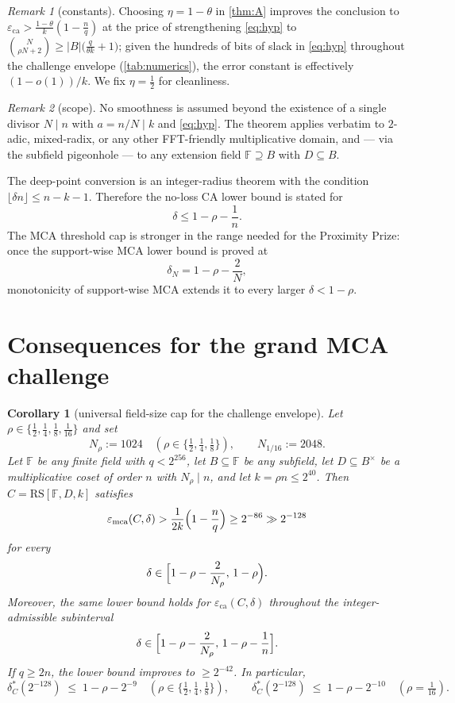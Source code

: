 \documentclass[11pt]{article}
\newtheorem{corollary}[corollary]{Corollary}
\theoremstyle{definition}
\theoremstyle{remark}
\newtheorem{remark}[remark]{Remark}
\newcommand{\F}{\mathbb{F}}
\newcommand{\B}{B}
\newcommand{\RS}{\mathrm{RS}}
\newcommand{\eca}{\varepsilon_{\mathrm{ca}}}
\newcommand{\emca}{\varepsilon_{\mathrm{mca}}}
\begin{document}
\begin{remark}[constants]\label{rem:eta}
Choosing $\eta=1-\theta$ in \cref{thm:A} improves the conclusion to $\eca>\frac{1-\theta}k(1-\frac nq)$ at the price of strengthening \eqref{eq:hyp} to $\binom N{\rho N+2}\ge|\B|\bigl(\frac q{\theta k}+1\bigr)$; given the hundreds of bits of slack in \eqref{eq:hyp} throughout the challenge envelope (\cref{tab:numerics}), the error constant is effectively $(1-o(1))/k$. We fix $\eta=\frac12$ for cleanliness.
\end{remark}

\begin{remark}[scope]\label{rem:scope}
No smoothness is assumed beyond the existence of a single divisor $N\mid n$ with $a=n/N\mid k$ and \eqref{eq:hyp}. The theorem applies verbatim to $2$-adic, mixed-radix, or any other FFT-friendly multiplicative domain, and --- via the subfield pigeonhole --- to any extension field $\F\supseteq\B$ with $D\subseteq\B$.

The deep-point conversion is an integer-radius theorem with the condition $\lfloor\delta n\rfloor\le n-k-1$. Therefore the no-loss CA lower bound is stated for
\[
        \delta \le 1-\rho-\frac1n .
\]
The MCA threshold cap is stronger in the range needed for the Proximity Prize: once the support-wise MCA lower bound is proved at
\[
        \delta_N=1-\rho-\frac2N,
\]
monotonicity of support-wise MCA extends it to every larger $\delta<1-\rho$.
\end{remark}

\section{Consequences for the grand MCA challenge}\label{sec:grand}

\begin{corollary}[universal field-size cap for the challenge envelope]\label{cor:grand}
Let $\rho\in\{\frac12,\frac14,\frac18,\frac1{16}\}$ and set
\[
N_\rho:=1024\quad(\rho\in\{\tfrac12,\tfrac14,\tfrac18\}),\qquad N_{1/16}:=2048 .
\]
Let $\F$ be any finite field with $q<2^{256}$, let $\B\subseteq\F$ be any subfield, let $D\subseteq\B^\times$ be a multiplicative coset of order $n$ with $N_\rho\mid n$, and let $k=\rho n\le2^{40}$. Then $C=\RS[\F,D,k]$ satisfies
\[
\emca(C,\delta)
>
\frac1{2k}\Bigl(1-\frac nq\Bigr)
\ge
2^{-86}
\gg
2^{-128}
\]
for every
\[
        \delta\in
        \Bigl[1-\rho-\frac2{N_\rho},\,1-\rho\Bigr).
\]
Moreover, the same lower bound holds for $\eca(C,\delta)$ throughout the integer-admissible subinterval
\[
        \delta\in
        \Bigl[1-\rho-\frac2{N_\rho},\,1-\rho-\frac1n\Bigr].
\]
If $q\ge2n$, the lower bound improves to $\ge2^{-42}$. In particular,
\[
\delta^*_C(2^{-128})\;\le\;1-\rho-2^{-9}\quad(\rho\in\{\tfrac12,\tfrac14,\tfrac18\}),
\qquad
\delta^*_C(2^{-128})\;\le\;1-\rho-2^{-10}\quad(\rho=\tfrac1{16}).
\]
\end{corollary}
\end{document}
